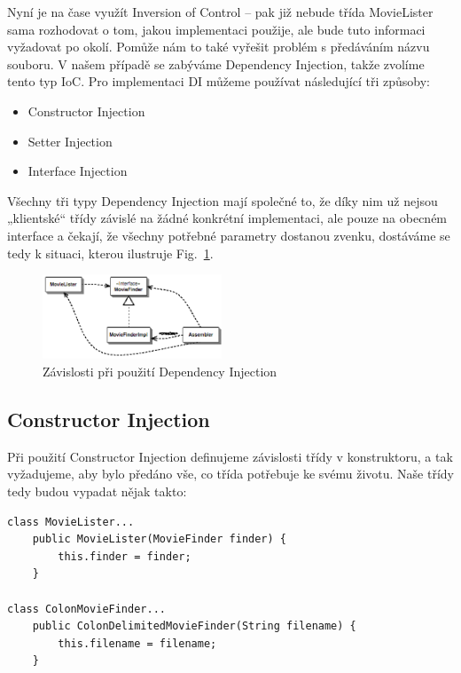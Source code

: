 \documentclass[a4paper,conference]{IEEEtran}
\newcommand{\fig}[1]{Fig.~\ref{fig:#1}}      %
\begin{document}
Nyní je na čase využít Inversion of Control – pak již nebude třída MovieLister sama rozhodovat o tom, jakou implementaci použije, ale bude tuto informaci vyžadovat po okolí. Pomůže nám to také vyřešit problém s předáváním názvu souboru. V našem případě se zabýváme Dependency Injection, takže zvolíme tento typ IoC. Pro implementaci DI můžeme používat následující tři způsoby:

\begin{itemize}
\item{Constructor Injection} 
\item{Setter Injection} 
\item{Interface Injection} 
\end{itemize}

Všechny tři typy Dependency Injection mají společné to, že díky nim už nejsou „klientské“ třídy závislé na žádné konkrétní implementaci, ale pouze na obecném interface a čekají, že všechny potřebné parametry dostanou zvenku, dostáváme se tedy k situaci, kterou ilustruje \fig{injector}.

\begin{figure}[!t]
\centering
\includegraphics[width=2.1in]{2-Injector}
\caption{Závislosti při použití Dependency Injection}
\label{fig:injector}
\end{figure}

\subsection{Constructor Injection}

Při použití Constructor Injection definujeme závislosti třídy v konstruktoru, a tak vyžadujeme, aby bylo předáno vše, co třída potřebuje ke svému životu. Naše třídy tedy budou vypadat nějak takto:

\lstset{language=Java, caption=MovieLister s použitím Constructor Injection, label=listing:Java}
\begin{lstlisting}
class MovieLister...
    public MovieLister(MovieFinder finder) {
        this.finder = finder;       
    }

class ColonMovieFinder...
    public ColonDelimitedMovieFinder(String filename) {
        this.filename = filename;
    }
\end{lstlisting}
\end{document}
